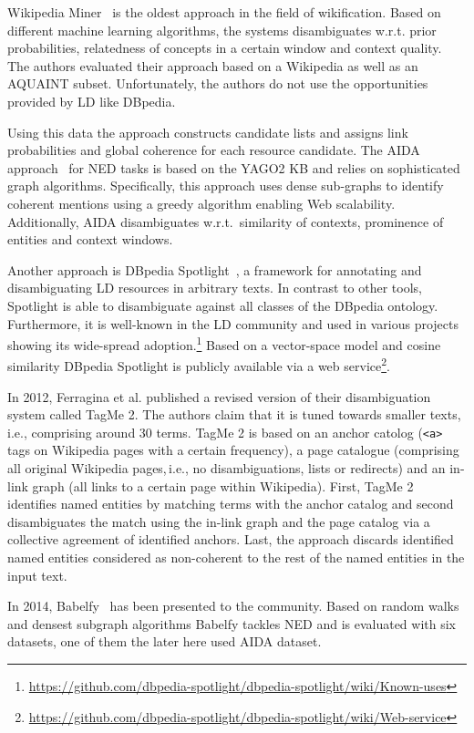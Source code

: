 Wikipedia Miner~\cite{milne2008learning} is the oldest approach in the field of {wikification}.
Based on different machine learning algorithms, the systems disambiguates w.r.t. prior probabilities, relatedness of concepts in a certain window and context quality. 
The authors evaluated their approach based on a Wikipedia as well as an AQUAINT subset. 
Unfortunately, the authors do not use the opportunities provided by \ac{LD} like DBpedia.

Using this data the approach constructs candidate lists and assigns link probabilities and global coherence for each resource candidate.
The AIDA approach~\cite{AIDA} for \ac{NED} tasks is based on the YAGO2 \ac{KB} and relies on sophisticated graph algorithms. 
Specifically, this approach uses dense sub-graphs to identify coherent mentions using a greedy algorithm enabling Web scalability. 
Additionally, AIDA disambiguates w.r.t.~similarity of contexts, prominence of entities and context windows.

Another approach is DBpedia Spotlight~\cite{spotlight}, a framework for annotating and disambiguating \ac{LD} resources in arbitrary texts.
In contrast to other tools, Spotlight is able to disambiguate against all classes of the DBpedia ontology.
Furthermore, it is well-known in the \ac{LD} community and used in various projects showing its wide-spread adoption.\footnote{\url{https://github.com/dbpedia-spotlight/dbpedia-spotlight/wiki/Known-uses}}
Based on a vector-space model and cosine similarity DBpedia Spotlight is publicly available via a web service\footnote{\url{https://github.com/dbpedia-spotlight/dbpedia-spotlight/wiki/Web-service}}.

In 2012, Ferragina et al. published a revised version of their disambiguation system called TagMe 2.
The authors claim that it is tuned towards smaller texts,\,i.e., comprising around 30 terms.
TagMe 2 is based on an anchor catolog (\texttt{<a>} tags on Wikipedia pages with a certain frequency), a page catalogue (comprising all original Wikipedia pages,\,i.e., no disambiguations, lists or redirects) and an in-link graph (all links to a certain page within Wikipedia).
First, TagMe 2 identifies named entities by matching terms with the anchor catalog and second disambiguates the match using the in-link graph and the page catalog via a collective agreement of identified anchors. 
Last, the approach discards identified named entities considered as non-coherent to the rest of the named entities in the input text.  

In 2014, Babelfy~\cite{babelfy} has been presented to the community.
Based on random walks and densest subgraph algorithms Babelfy tackles \ac{NED} and is evaluated with six datasets, one of them the later here used AIDA dataset. 

